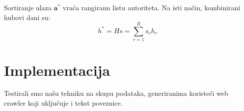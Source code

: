 \documentclass[11pt]{article}
\begin{document}
Sortiranje ulaza $\boldsymbol{a^{*}}$ vraća rangiranu listu autoriteta. Na isti način, kombinirani hubovi dani su:
\begin{equation}
    h^{*} = Hs = \sum_{r=1} ^{R} s_r h_r
\end{equation}

\newpage
\section{Implementacija}
Testirali smo našu tehniku na skupu podataka, generiranima koristeći web crawler koji uključuje i tekst poveznice.

\begin{lstlisting}
\end{lstlisting}
\end{document}
